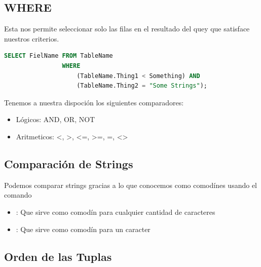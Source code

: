 \documentclass[12pt, fleqn]{article}                             %
\newcommand \Quote {\qq}                                        %
\begin{document}
    \clearpage
    \subsection{WHERE}

        Esta nos permite seleccionar solo las filas en el resultado del quey
        que satisface nuestros criterios.

        \begin{lstlisting}[language=SQL, gobble=12]
            SELECT FielName FROM TableName
                WHERE
                    (TableName.Thing1 < Something) AND
                    (TableName.Thing2 = "Some Strings");
        \end{lstlisting}

        Tenemos a nuestra dispoción los siguientes comparadores:
        \begin{itemize}
            \item Lógicos: AND, OR, NOT
            \item Aritmeticos: <, >, <=, >=, =, <>
        \end{itemize}



    \subsection{Comparación de Strings}
        
        Podemos comparar strings gracias a lo que conocemos como comodínes usando
        el comando \Quote{LIKE}
        \begin{itemize}
            \item \Quote{\%}: Que sirve como comodín para cualquier cantidad de caracteres 
            \item \Quote{\_}: Que sirve como comodín para un caracter 
        \end{itemize}


    \subsection{Orden de las Tuplas}
\end{document}
